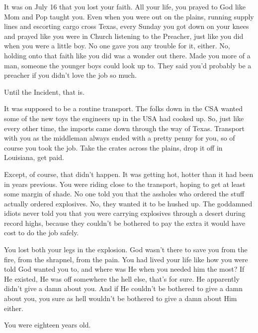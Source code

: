 \documentclass[char]{airship}
\begin{document}
\name{\cCowboy{}}




It was on July 16 that you lost your faith.  All your life, you prayed
to God like Mom and Pop taught you.  Even when you were out on the
plains, running supply lines and escorting cargo cross Texas, every
Sunday you got down on your knees and prayed like you were in Church
listening to the Preacher, just like you did when you were a little
boy.  No one gave you any trouble for it, either.  No, holding onto
that faith like you did was a wonder out there.  Made you more of a
man, someone the younger boys could look up to.  They said you'd
probably be a preacher if you didn't love the job so much.

Until the Incident, that is.

It was supposed to be a routine transport.  The folks down in the CSA
wanted some of the new toys the engineers up in the USA had cooked up.
So, just like every other time, the imports came down through the way
of Texas.  Transport with you as the middleman always ended with a
pretty penny for you, so of course you took the job.  Take the crates
across the plains, drop it off in Louisiana, get paid.

Except, of  course, that  didn't happen.  It  was getting  hot, hotter
than it  had been  in years  previous.  You were  riding close  to the
transport, hoping to  get at least some margin of  shade.  No one told
you  that  the  assholes   who  ordered  the  stuff  actually  ordered
explosives.  No, they wanted it to be hushed up.  The goddamned idiots
never  told you  that you  were carrying  explosives through  a desert
during  record highs,  because they  couldn't be  bothered to  pay the
extra it would have cost to do the job safely.

You lost both your legs in the explosion.  God wasn't there to save
you from the fire, from the shrapnel, from the pain.  You had lived
your life like how you were told God wanted you to, and where was He
when you needed him the most?  If He existed, He was off somewhere the
hell else, that's for sure.  He apparently didn't give a damn about
you.  And if He couldn't be bothered to give a damn about you, you
sure as hell wouldn't be bothered to give a damn about Him either.

You were eighteen years old.
\end{document}
